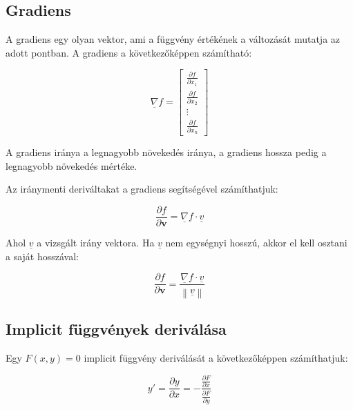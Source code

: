 \documentclass{article}
\begin{document}
\newpage

\subsection{Gradiens}

A gradiens egy olyan vektor, ami a függvény értékének a változását mutatja az adott pontban. A gradiens a következőképpen számítható:

\begin{equation*}
    \underline{\nabla} f = \begin{bmatrix} \frac{\partial f}{\partial x_1} \\ \frac{\partial f}{\partial x_2} \\ \vdots \\ \frac{\partial f}{\partial x_n} \end{bmatrix}
\end{equation*}

A gradiens iránya a legnagyobb növekedés iránya, a gradiens hossza pedig a legnagyobb növekedés mértéke.

\vspace{4mm}

Az iránymenti deriváltakat a gradiens segítségével számíthatjuk:

\begin{equation*}
    \frac{\partial f}{\partial \mathbf{v}} = \underline{\nabla} f \cdot \underline{v}
\end{equation*}

Ahol $\underline{v}$ a vizsgált irány vektora. Ha $\underline{v}$ nem egységnyi hosszú, akkor el kell osztani a saját hosszával:

\begin{equation*}
    \frac{\partial f}{\partial \mathbf{v}} = \frac{\underline{\nabla} f \cdot \underline{v}}{\left\lVert \underline{v} \right\rVert}
\end{equation*}

\subsection{Implicit függvények deriválása}

Egy $F(x,y)=0$ implicit függvény deriválását a következőképpen számíthatjuk:

\begin{equation*}
    y' = \frac{\partial y}{\partial x} = -\frac{\frac{\partial F}{\partial x}}{\frac{\partial F}{\partial y}}
\end{equation*}
\end{document}
